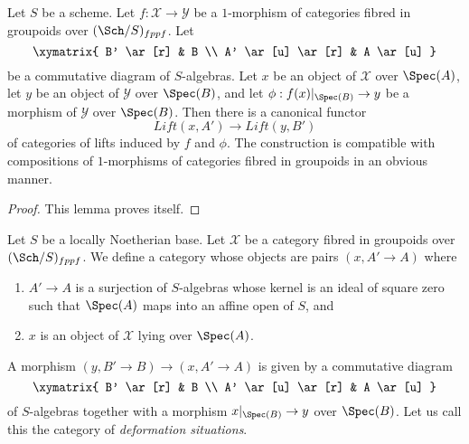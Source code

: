 \begin{lemma}
\label{lemma-functoriality}
Let $S$ be a scheme. Let $f : \mathcal{X} \to \mathcal{Y}$ be a $1$-morphism
of categories fibred in groupoids over $(\Sch/S)_{fppf}$. Let
$$
\xymatrix{
B' \ar[r] & B \\
A' \ar[u] \ar[r] & A \ar[u]
}
$$
be a commutative diagram of $S$-algebras. Let $x$ be an object of $\mathcal{X}$
over $\Spec(A)$, let $y$ be an object of $\mathcal{Y}$ over $\Spec(B)$,
and let $\phi : f(x)|_{\Spec(B)} \to y$ be a morphism of $\mathcal{Y}$
over $\Spec(B)$. Then there is a canonical functor
$$
\textit{Lift}(x, A') \longrightarrow \textit{Lift}(y, B')
$$
of categories of lifts induced by $f$ and $\phi$. The construction is
compatible with compositions of $1$-morphisms of categories fibred in
groupoids in an obvious manner.
\end{lemma}

\begin{proof}
This lemma proves itself.
\end{proof}

\noindent
Let $S$ be a locally Noetherian base. Let $\mathcal{X}$ be a category fibred
in groupoids over $(\Sch/S)_{fppf}$. We define a category whose objects are
pairs $(x, A' \to A)$ where
\begin{enumerate}
\item $A' \to A$ is a surjection of $S$-algebras whose kernel
is an ideal of square zero such that $\Spec(A)$ maps into an affine open
of $S$, and
\item $x$ is an object of $\mathcal{X}$ lying over $\Spec(A)$.
\end{enumerate}
A morphism $(y, B' \to B) \to (x, A' \to A)$ is given by a commutative
diagram
$$
\xymatrix{
B' \ar[r] & B \\
A' \ar[u] \ar[r] & A \ar[u]
}
$$
of $S$-algebras together with a morphism $x|_{\Spec(B)} \to y$ over
$\Spec(B)$. Let us call this the category of {\it deformation situations}.

